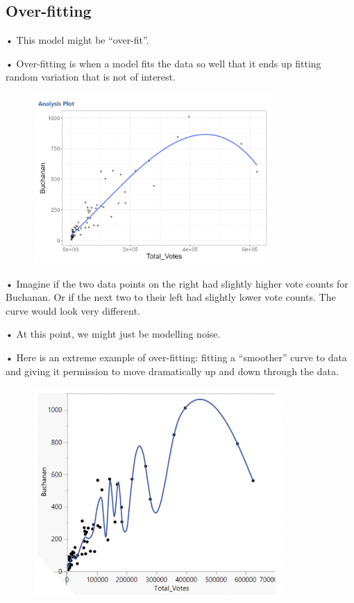 \documentclass[
  letterpaper,
  DIV=11,
  numbers=noendperiod]{scrreprt}
\begin{document}
\hypertarget{over-fitting}{%
\subsection{Over-fitting}\label{over-fitting}}

• This model might be ``over-fit''.

• Over-fitting is when a model fits the data so well that it ends up
fitting random variation that is not of interest.

\begin{figure}

{\centering \includegraphics[width=3.57292in,height=\textheight]{images/mod4_pt2_13.png}

}

\end{figure}

• Imagine if the two data points on the right had slightly higher vote
counts for Buchanan. Or if the next two to their left had slightly lower
vote counts. The curve would look very different.

• At this point, we might just be modelling noise.

• Here is an extreme example of over-fitting: fitting a ``smoother''
curve to data and giving it permission to move dramatically up and down
through the data.

\begin{figure}

{\centering \includegraphics[width=3.71875in,height=\textheight]{images/mod4_pt2_14.png}

}

\end{figure}
\end{document}
